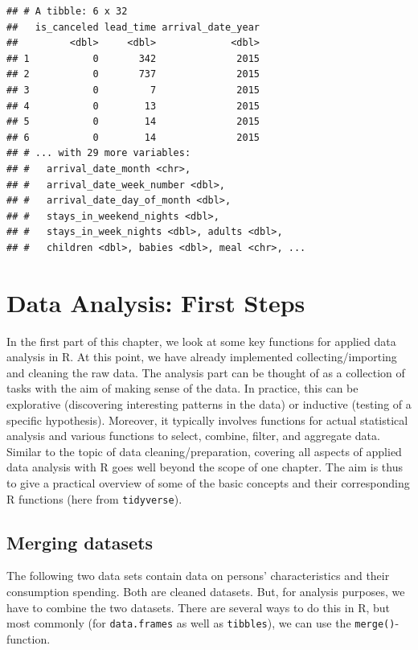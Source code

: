 \documentclass[
  12pt,
]{style/krantz}
\begin{document}
\begin{verbatim}
## # A tibble: 6 x 32
##   is_canceled lead_time arrival_date_year
##         <dbl>     <dbl>             <dbl>
## 1           0       342              2015
## 2           0       737              2015
## 3           0         7              2015
## 4           0        13              2015
## 5           0        14              2015
## 6           0        14              2015
## # ... with 29 more variables:
## #   arrival_date_month <chr>,
## #   arrival_date_week_number <dbl>,
## #   arrival_date_day_of_month <dbl>,
## #   stays_in_weekend_nights <dbl>,
## #   stays_in_week_nights <dbl>, adults <dbl>,
## #   children <dbl>, babies <dbl>, meal <chr>, ...
\end{verbatim}

\hypertarget{data-analysis-first-steps}{%
\chapter{Data Analysis: First Steps}\label{data-analysis-first-steps}}

In the first part of this chapter, we look at some key functions for applied data analysis in R. At this point, we have already implemented collecting/importing and cleaning the raw data. The analysis part can be thought of as a collection of tasks with the aim of making sense of the data. In practice, this can be explorative (discovering interesting patterns in the data) or inductive (testing of a specific hypothesis). Moreover, it typically involves functions for actual statistical analysis and various functions to select, combine, filter, and aggregate data. Similar to the topic of data cleaning/preparation, covering all aspects of applied data analysis with R goes well beyond the scope of one chapter. The aim is thus to give a practical overview of some of the basic concepts and their corresponding R functions (here from \texttt{tidyverse}).

\hypertarget{merging-datasets}{%
\section{Merging datasets}\label{merging-datasets}}

The following two data sets contain data on persons' characteristics and their consumption spending. Both are cleaned datasets. But, for analysis purposes, we have to combine the two datasets. There are several ways to do this in R, but most commonly (for \texttt{data.frames} as well as \texttt{tibbles}), we can use the \texttt{merge()}-function.
\end{document}
